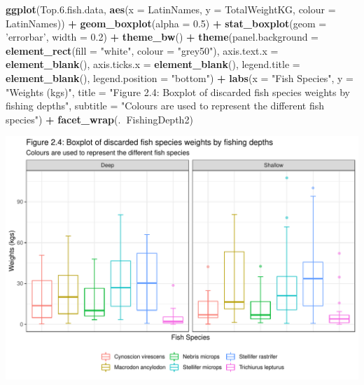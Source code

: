 \documentclass[
]{book}
\newenvironment{Shaded}{\begin{snugshade}}{\end{snugshade}}
\newcommand{\DataTypeTok}[1]{\textcolor[rgb]{0.13,0.29,0.53}{#1}}
\newcommand{\FloatTok}[1]{\textcolor[rgb]{0.00,0.00,0.81}{#1}}
\newcommand{\KeywordTok}[1]{\textcolor[rgb]{0.13,0.29,0.53}{\textbf{#1}}}
\newcommand{\NormalTok}[1]{#1}
\newcommand{\OperatorTok}[1]{\textcolor[rgb]{0.81,0.36,0.00}{\textbf{#1}}}
\newcommand{\StringTok}[1]{\textcolor[rgb]{0.31,0.60,0.02}{#1}}
\begin{document}
\begin{Shaded}
\begin{Highlighting}[]
\KeywordTok{ggplot}\NormalTok{(Top.}\FloatTok{6.}\NormalTok{fish.data,}
  \KeywordTok{aes}\NormalTok{(}\DataTypeTok{x =}\NormalTok{ LatinNames, }
    \DataTypeTok{y =}\NormalTok{ TotalWeightKG, }
    \DataTypeTok{colour =}\NormalTok{ LatinNames)) }\OperatorTok{+}
\StringTok{  }\KeywordTok{geom_boxplot}\NormalTok{(}\DataTypeTok{alpha =} \FloatTok{0.5}\NormalTok{) }\OperatorTok{+}\StringTok{ }
\StringTok{  }\KeywordTok{stat_boxplot}\NormalTok{(}\DataTypeTok{geom =} \StringTok{'errorbar'}\NormalTok{, }\DataTypeTok{width =} \FloatTok{0.2}\NormalTok{) }\OperatorTok{+}
\StringTok{  }\KeywordTok{theme_bw}\NormalTok{() }\OperatorTok{+}
\StringTok{  }\KeywordTok{theme}\NormalTok{(}\DataTypeTok{panel.background =} \KeywordTok{element_rect}\NormalTok{(}\DataTypeTok{fill =} \StringTok{"white"}\NormalTok{,}
    \DataTypeTok{colour =} \StringTok{"grey50"}\NormalTok{),}
    \DataTypeTok{axis.text.x =} \KeywordTok{element_blank}\NormalTok{(),}
    \DataTypeTok{axis.ticks.x =} \KeywordTok{element_blank}\NormalTok{(),}
    \DataTypeTok{legend.title =} \KeywordTok{element_blank}\NormalTok{(),}
    \DataTypeTok{legend.position =} \StringTok{"bottom"}\NormalTok{)  }\OperatorTok{+}
\StringTok{  }\KeywordTok{labs}\NormalTok{(}\DataTypeTok{x =} \StringTok{"Fish Species"}\NormalTok{,}
    \DataTypeTok{y =} \StringTok{"Weights (kgs)"}\NormalTok{,}
    \DataTypeTok{title =} \StringTok{"Figure 2.4: Boxplot of discarded fish species weights by fishing depths"}\NormalTok{,}
    \DataTypeTok{subtitle =} \StringTok{"Colours are used to represent the different fish species"}\NormalTok{) }\OperatorTok{+}
\StringTok{  }\KeywordTok{facet_wrap}\NormalTok{(.}\OperatorTok{~}\NormalTok{FishingDepth2) }
\end{Highlighting}
\end{Shaded}

\begin{center}\includegraphics{bookdown-demo_files/figure-latex/unnamed-chunk-15-1} \end{center}
\end{document}
